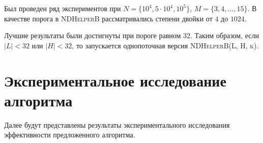 Был проведен ряд экспериментов при $N=\{10^4, 5\cdot10^4, 10^5\}$, $M=\{3,4,\ldots,15\}$.
В качестве порога в \textsc{NDHelperB} рассматривались степени двойки от $4$ до $1024$.

Лучшие результаты были достигнуты при пороге равном $32$.
Таким образом, если $|L| < 32$ или $|H| < 32$, то запускается однопоточная версия \textsc{NDHelperB(L, H, k)}.

\section{Экспериментальное исследование алгоритма}
Далее будут представлены результаты экспериментального исследования эффективности предложенного алгоритма.


